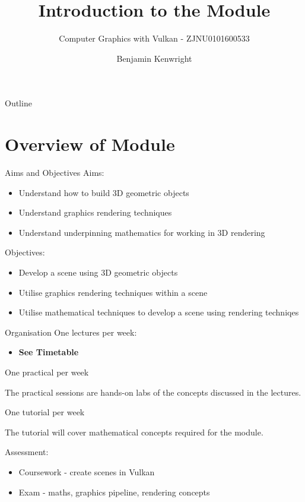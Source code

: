 \documentclass[handout,18pt]{beamer}
\author{Benjamin Kenwright}
\title[Introduction to Module]{Introduction to the Module}
\subtitle[Computer Graphics with Vulkan]{Computer Graphics with Vulkan - ZJNU0101600533}
\institute{Zhanjiang Normal University}
\date{}
\begin{document}
\begin{frame} %
    \titlepage
\end{frame}
    
\begin{frame}{Outline}
    \tableofcontents[pausesections]
\end{frame}
    
\section{Overview of Module}
    
\begin{frame}{Aims and Objectives}
    \pause
    Aims:
    \begin{itemize}
        \item Understand how to build 3D geometric objects
        \item Understand graphics rendering techniques
        \item Understand underpinning mathematics for working in 3D rendering
    \end{itemize}
    \vspace{11pt}
    \pause
    
    Objectives:
    \begin{itemize}
        \item Develop a scene using 3D geometric objects
        \item Utilise graphics rendering techniques within a scene
        \item Utilise mathematical techniques to develop a scene using rendering techniqes
    \end{itemize}
\end{frame}

\begin{frame}{Organisation}
\pause
One lectures per week:
\begin{itemize}
\item \textbf{See Timetable}
\end{itemize}
\pause

One practical per week

The practical sessions are hands-on labs of the concepts discussed in the lectures.

\pause
One tutorial per week

The tutorial will cover mathematical concepts required for the module.

Assessment:
\begin{itemize}
\item Coursework - create scenes in Vulkan
\item Exam - maths, graphics pipeline, rendering concepts
\end{itemize}
\end{frame}
\end{document}
